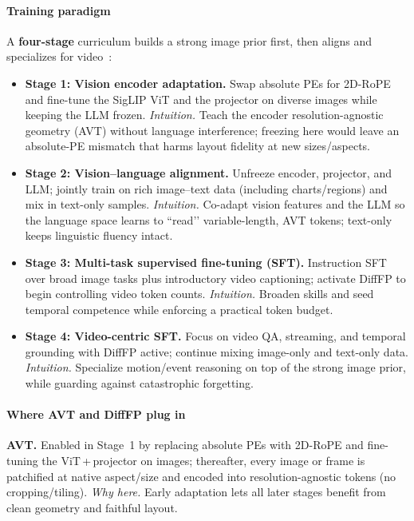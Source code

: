 \begin{enrichment}
\begin{enrichment}
        \paragraph{Training paradigm}
        A \textbf{four\mbox{-}stage} curriculum builds a strong image prior first, then aligns and specializes for video~\cite{zhang2025_videollama3}:
        \begin{itemize}
            \item \textbf{Stage 1: Vision encoder adaptation.} Swap absolute PEs for 2D\mbox{-}RoPE and fine\mbox{-}tune the SigLIP ViT and the projector on diverse images while keeping the LLM frozen. \emph{Intuition.} Teach the encoder resolution\mbox{-}agnostic geometry (AVT) without language interference; freezing here would leave an absolute\mbox{-}PE mismatch that harms layout fidelity at new sizes/aspects.
            \item \textbf{Stage 2: Vision--language alignment.} Unfreeze encoder, projector, and LLM; jointly train on rich image--text data (including charts/regions) and mix in text\mbox{-}only samples. \emph{Intuition.} Co\mbox{-}adapt vision features and the LLM so the language space learns to “read’’ variable\mbox{-}length, AVT tokens; text\mbox{-}only keeps linguistic fluency intact.
            \item \textbf{Stage 3: Multi\mbox{-}task supervised fine\mbox{-}tuning (SFT).} Instruction SFT over broad image tasks plus introductory video captioning; activate DiffFP to begin controlling video token counts. \emph{Intuition.} Broaden skills and seed temporal competence while enforcing a practical token budget.
            \item \textbf{Stage 4: Video\mbox{-}centric SFT.} Focus on video QA, streaming, and temporal grounding with DiffFP active; continue mixing image\mbox{-}only and text\mbox{-}only data. \emph{Intuition.} Specialize motion/event reasoning on top of the strong image prior, while guarding against catastrophic forgetting.
        \end{itemize}
        
        \paragraph{Where AVT and DiffFP plug in}
        \textbf{AVT.} Enabled in Stage~1 by replacing absolute PEs with 2D\mbox{-}RoPE and fine\mbox{-}tuning the ViT\,+\,projector on images; thereafter, every image or frame is patchified at native aspect/size and encoded into resolution\mbox{-}agnostic tokens (no cropping/tiling). \emph{Why here.} Early adaptation lets all later stages benefit from clean geometry and faithful layout.
        

\end{enrichment}
\end{enrichment}
